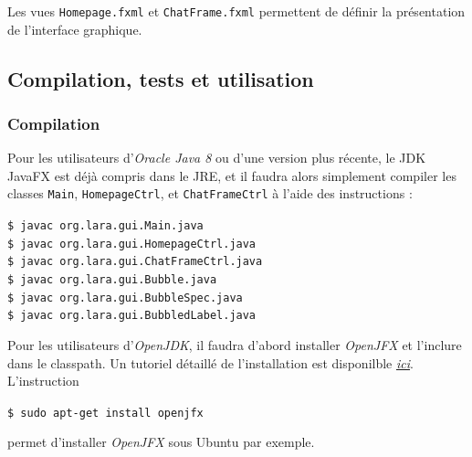 \documentclass[10pt,a4paper]{article}
\begin{document}
Les vues \texttt{Homepage.fxml} et \texttt{ChatFrame.fxml} permettent de définir la présentation de l'interface graphique.



\subsection{Compilation, tests et utilisation}

\subsubsection{Compilation}
Pour les utilisateurs d'\textit{Oracle Java 8} ou d'une version plus récente, le JDK JavaFX est déjà compris dans le JRE, et il faudra alors simplement compiler les classes \texttt{Main}, \texttt{HomepageCtrl}, et \texttt{ChatFrameCtrl} à l'aide des instructions :

\begin{center}
	\texttt{\$ javac org.lara.gui.Main.java} \\
	\texttt{\$ javac org.lara.gui.HomepageCtrl.java}\\
	\texttt{\$ javac org.lara.gui.ChatFrameCtrl.java} \\
	\texttt{\$ javac org.lara.gui.Bubble.java} \\
	\texttt{\$ javac org.lara.gui.BubbleSpec.java} \\
	\texttt{\$ javac org.lara.gui.BubbledLabel.java}
\end{center}

Pour les utilisateurs d'\textit{OpenJDK}, il faudra d'abord installer \textit{OpenJFX} et l'inclure dans le classpath. Un tutoriel détaillé de l'installation est disponilble \href{https://wiki.openjdk.java.net/display/OpenJFX/Building+OpenJFX}{\textit{ici}}. L'instruction

\begin{center}
	\texttt{\$ sudo apt-get install openjfx}
\end{center}
permet d'installer \textit{OpenJFX} sous Ubuntu par exemple. \\
\end{document}
